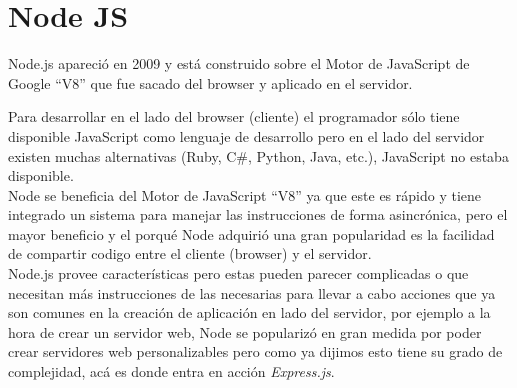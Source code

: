 \section{Node JS}
\label{sec:node_js}
  Node.js apareció en 2009 y está construido sobre el Motor de JavaScript de Google ``V8'' que fue sacado del browser y aplicado en el servidor.

  Para desarrollar en el lado del browser (cliente) el programador sólo tiene disponible JavaScript como lenguaje de desarrollo pero en el lado del servidor existen muchas alternativas (Ruby, C\#, Python, Java, etc.), JavaScript no estaba disponible.\\

  Node se beneficia del Motor de JavaScript ``V8'' ya que este es rápido y tiene integrado un sistema para manejar las instrucciones de forma asincrónica, pero el mayor beneficio y el porqué Node adquirió una gran popularidad es la facilidad de compartir codigo entre el cliente (browser) y el servidor.\\

  Node.js provee características pero estas pueden parecer complicadas o que necesitan más instrucciones de las necesarias para llevar a cabo acciones que ya son comunes en la creación de aplicación en lado del servidor, por ejemplo a la hora de crear un servidor web, Node se popularizó en gran medida por poder crear servidores web personalizables pero como ya dijimos esto tiene su grado de complejidad, acá es donde entra en acción \emph{Express.js}.
